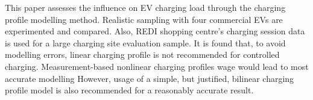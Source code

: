 	
	\noindent \cite{simolin2022assessing} This paper assesses the influence on EV charging load through the charging profile modelling method.
	Realistic sampling with four commercial EVs are experimented and compared. Also, REDI shopping centre’s charging session data is used for a large charging site evaluation sample.
	It is found that, to avoid modelling errors, linear charging profile is not recommended for controlled charging.  Measurement-based nonlinear charging profiles wage would lead to most accurate modelling 
	However, usage of a simple, but justified, bilinear charging profile model is also recommended for a reasonably accurate result.
	 
	